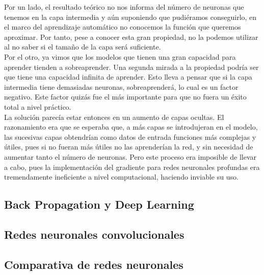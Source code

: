 Por un lado, el resultado teórico no nos informa del número de neuronas que tenemos en la capa intermedia y aún suponiendo que pudiéramos conseguirlo, en el marco del aprendizaje automático no conocemos la función que queremos aproximar. Por tanto, pese a conocer esta gran propiedad, no la podemos utilizar al no saber si el tamaño de la capa será suficiente.\\

Por el otro, ya vimos que los modelos que tienen una gran capacidad para aprender tienden a sobreaprender. Una segunda mirada a la propiedad podría ser que tiene una capacidad infinita de aprender. Esto lleva a pensar que si la capa intermedia tiene demasiadas neuronas, sobreaprenderá, lo cual es un factor negativo. Este factor quizás fue el más importante para que no fuera un éxito total a nivel práctico.\\

La solución parecía estar entonces en un aumento de capas ocultas. El razonamiento era que se esperaba que, a más capas se introdujeran en el modelo, las sucesivas capas obtendrían como datos de entrada funciones más complejas y útiles, pues si no fueran más útiles no las aprenderían la red, y sin necesidad de aumentar tanto el número de neuronas. Pero este proceso era imposible de llevar a cabo, pues la implementación del gradiente para redes neuronales profundas era tremendamente ineficiente a nivel computacional, haciendo inviable su uso.\\

\subsection{Back Propagation y Deep Learning}


\subsection{Redes neuronales convolucionales}


\subsection{Comparativa de redes neuronales}
